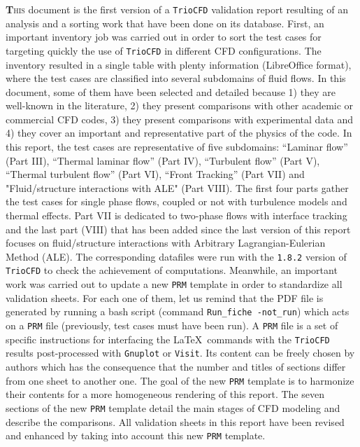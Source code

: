 \lettrine[lines=2,slope=0pt,nindent=4pt]{\textbf{T}}{his} document
is the first version of a \texttt{TrioCFD} validation report resulting
of an analysis and a sorting work that have been done on its database.
First, an important inventory job was carried out in order to sort
the test cases for targeting quickly the use of \texttt{TrioCFD}
in different CFD configurations. The inventory resulted in a single
table with plenty information (LibreOffice format), where the test
cases are classified into several subdomains of fluid flows. In this
document, some of them have been selected and detailed because 1)
they are well-known in the literature, 2) they present comparisons
with other academic or commercial CFD codes, 3) they present comparisons
with experimental data and 4) they cover an important and representative part of the
physics of the code. In this report, the test cases are representative
of five subdomains: ``Laminar flow'' (Part III), ``Thermal laminar
flow'' (Part IV), ``Turbulent flow'' (Part V), ``Thermal turbulent
flow'' (Part VI), ``Front Tracking'' (Part VII) and "Fluid/structure
interactions with ALE" (Part VIII). The first four
parts gather the test cases for single phase flows, coupled or not with
turbulence models and thermal effects. Part VII is dedicated
to two-phase flows with interface tracking and the last part (VIII) that
has been added since the last version of this report focuses on fluid/structure
interactions with Arbitrary Lagrangian-Eulerian Method (ALE). The corresponding datafiles
were run with the \texttt{1.8.2} version of \texttt{TrioCFD}
to check the achievement of computations. Meanwhile, an important
work was carried out to update a new \texttt{PRM} template in order
to standardize all validation sheets. For each one of them, let us
remind that the PDF file is generated by running a bash script (command
\texttt{Run\_fiche -not\_run}) which acts on a \texttt{PRM} file (previously, test cases must have
been run). A \texttt{PRM} file is a set of specific instructions for interfacing
the \LaTeX ~commands with the \texttt{TrioCFD} results post-processed
with \texttt{Gnuplot} or \texttt{Visit}. Its content can be freely
chosen by authors which has the consequence that the number and titles
of sections differ from one sheet to another one. The goal of the
new \texttt{PRM} template is to harmonize their contents for a more
homogeneous rendering of this report. The seven sections of the new
\texttt{PRM} template detail the main stages of CFD modeling and describe
the comparisons. All validation sheets in this report have been revised
and enhanced by taking into account this new \texttt{PRM} template.

